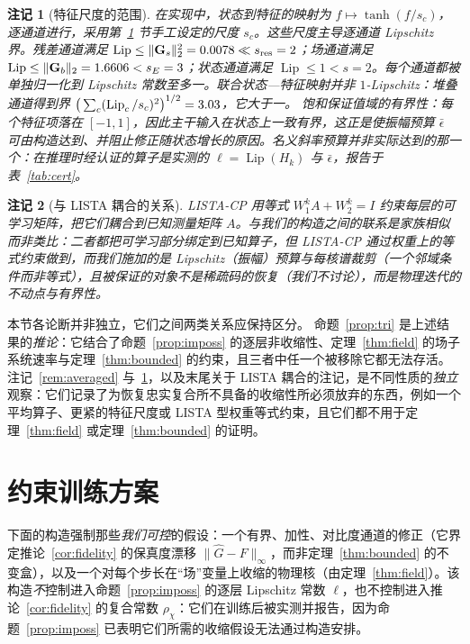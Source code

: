 \documentclass[UTF8,a4paper,11pt]{ctexart}
\newcommand{\norm}[1]{\lVert #1 \rVert}
\newcommand{\numv}[1]{#1}
\newtheorem{Remark}{注记}[section]
\begin{document}
\begin{Remark}[特征尺度的范围]\label{rem:featscale}
在实现中，状态到特征的映射为 $f\mapsto\tanh(f/s_c)$，逐通道进行，采用第~\ref{sec:training} 节手工设定的尺度 $s_c$。这些尺度主导逐通道 Lipschitz 界。残差通道满足 $\operatorname{Lip}\le\norm{\mathbf{G}_s}_2^{2}=\numv{\NumLipResidChan}\ll s_{\mathrm{res}}=2$；场通道满足 $\operatorname{Lip}\le\norm{\mathbf{G}_b}_2=\numv{\gbnorm}<s_E=3$；状态通道满足 $\operatorname{Lip}\le1<s=2$。每个通道都被单独归一化到 Lipschitz 常数至多一。联合状态—特征映射\emph{并非} $1$-Lipschitz：堆叠通道得到界 $\big(\sum_c(\operatorname{Lip}_c/s_c)^{2}\big)^{1/2}=\numv{\NumFeatJointLip}$，它大于一。
饱和保证\emph{值域}的有界性：每个特征项落在 $[-1,1]$，因此主干输入在状态上一致有界，这正是使振幅预算 $\bar\epsilon$ 可由构造达到、并阻止修正随状态增长的原因。名义斜率预算并非实际达到的那一个：在推理时经认证的算子是实测的 $\ell=\operatorname{Lip}(H_k)$ 与 $\bar\epsilon$，报告于表~\ref{tab:cert}。
\end{Remark}

\begin{Remark}[与 LISTA 耦合的关系]
LISTA-CP \cite{listacp} 用\emph{等式} $W_1^kA+W_2^k=I$ 约束每层的可学习矩阵，把它们耦合到已知测量矩阵 $A$。与我们的构造之间的联系是家族相似而非类比：二者都把可学习部分绑定到已知算子，但 LISTA-CP 通过权重上的等式约束做到，而我们施加的是 Lipschitz（振幅）预算与每核谱裁剪（一个邻域条件而非等式），且被保证的对象不是稀疏码的恢复（我们不讨论），而是物理迭代的不动点与有界性。
\end{Remark}

本节各论断并非独立，它们之间两类关系应保持区分。
命题~\ref{prop:tri} 是上述结果的\emph{推论}：它结合了命题~\ref{prop:imposs} 的逐层非收缩性、定理~\ref{thm:field} 的场子系统速率与定理~\ref{thm:bounded} 的约束，且三者中任一个被移除它都无法存活。注记~\ref{rem:averaged} 与~\ref{rem:featscale}，以及末尾关于 LISTA 耦合的注记，是不同性质的\emph{独立}观察：它们记录了为恢复忠实复合所不具备的收缩性所必须放弃的东西，例如一个平均算子、更紧的特征尺度或 LISTA 型权重等式约束，且它们都不用于定理~\ref{thm:field} 或定理~\ref{thm:bounded} 的证明。

\section{约束训练方案}\label{sec:training}
下面的构造强制那些\emph{我们可控}的假设：一个有界、加性、对比度通道的修正（它界定推论~\ref{cor:fidelity} 的保真度漂移 $\norm{\hat G-F}_\infty$，而非定理~\ref{thm:bounded} 的不变盒），以及一个对每个步长在“场”变量上收缩的物理核（由定理~\ref{thm:field}）。该构造\emph{不}控制进入命题~\ref{prop:imposs} 的逐层 Lipschitz 常数 $\ell$，也不控制进入推论~\ref{cor:fidelity} 的复合常数 $\rho_\chi$：它们在训练后被实测并报告，因为命题~\ref{prop:imposs} 已表明它们所需的收缩假设无法通过构造安排。
\end{document}
